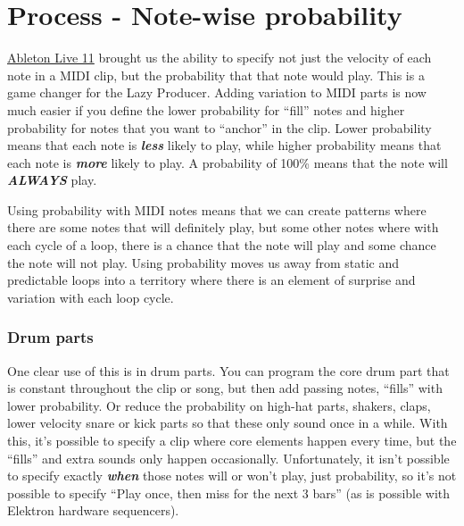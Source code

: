 \documentclass[
  12pt,
  letterpaper,
  oneside,
  open=any]{scrbook}
\begin{document}

\chapter{Process - Note-wise
probability}\label{Chapter-002-Process-Note_wise_probability}

\href{https://www.ableton.com/en/live-manual/11/welcome-to-live/\#welcome-to-live}{Ableton
Live 11} brought us the ability to specify not just the velocity of each
note in a MIDI clip, but the probability that that note would play. This
is a game changer for the Lazy Producer. Adding variation to MIDI parts
is now much easier if you define the lower probability for ``fill''
notes and higher probability for notes that you want to ``anchor'' in
the clip. Lower probability means that each note is \textbf{\emph{less}}
likely to play, while higher probability means that each note is
\textbf{\emph{more}} likely to play. A probability of 100\% means that
the note will \textbf{\emph{ALWAYS}} play.

\begin{tcolorbox}[enhanced jigsaw, opacitybacktitle=0.6, rightrule=.15mm, leftrule=.75mm, opacityback=0, toptitle=1mm, toprule=.15mm, breakable, titlerule=0mm, colback=white, bottomtitle=1mm, title=\textcolor{quarto-callout-tip-color}{\faLightbulb}\hspace{0.5em}{Key idea}, coltitle=black, left=2mm, colframe=quarto-callout-tip-color-frame, bottomrule=.15mm, colbacktitle=quarto-callout-tip-color!10!white, arc=.35mm]

Using probability with MIDI notes means that we can create patterns
where there are some notes that will definitely play, but some other
notes where with each cycle of a loop, there is a chance that the note
will play and some chance the note will not play. Using probability
moves us away from static and predictable loops into a territory where
there is an element of surprise and variation with each loop cycle.

\end{tcolorbox}

\subsection{Drum parts}\label{drum-parts}

One clear use of this is in drum parts. You can program the core drum
part that is constant throughout the clip or song, but then add passing
notes, ``fills'' with lower probability. Or reduce the probability on
high-hat parts, shakers, claps, lower velocity snare or kick parts so
that these only sound once in a while. With this, it's possible to
specify a clip where core elements happen every time, but the ``fills''
and extra sounds only happen occasionally. Unfortunately, it isn't
possible to specify exactly \textbf{\emph{when}} those notes will or
won't play, just probability, so it's not possible to specify ``Play
once, then miss for the next 3 bars'' (as is possible with Elektron
hardware sequencers).
\end{document}
